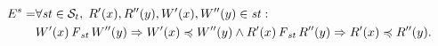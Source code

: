 \documentclass[acmlarge, ,11pt]{acmart}
\begin{document}
    \begin{align}\label{eqn:PC}
\begin{split}
E^{s} = & \forall \mathit{st} \in \mathcal{S}_t, \; R'(x), R''(y), W'(x), W''(y) \in \mathit{st}: \\
& W'(x) \operatorname{\it F}_\mathit{st} W''(y)  \Rightarrow  W'(x) \preccurlyeq W''(y)  \wedge R'(x) \operatorname{\it F}_\mathit{st} R''(y)  \Rightarrow  R'(x) \preccurlyeq R''(y).
\end{split}
  \end{align}   %
\end{document}
